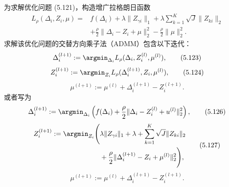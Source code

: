 为求解优化问题 (5.121)，构造增广拉格朗日函数
\begin{equation}
\begin{aligned}
L_\rho(\Delta_i,Z_i,\mu)={}&f(\Delta_i)+\lambda\lVert Z_{\gamma i}\rVert_1
+\lambda\sum_{k=1}^K\sqrt J\lVert Z_{ki}\rVert_2\\
&+\frac\rho2\lVert\Delta_i-Z_i+\mu\rVert_2^2-\frac\rho2\lVert\mu\rVert_2^2.
\end{aligned}
\tag{5.122}
\end{equation}
求解该优化问题的交替方向乘子法（ADMM）包含以下迭代：
\begin{equation}
\Delta_i^{(l+1)}:=\argmin_{\Delta_i}L_\rho(\Delta_i,Z_i^{(l)},\mu^{(l)}),
\tag{5.123}
\end{equation}
\begin{equation}
Z_i^{(l+1)}:=\argmin_{Z_i}L_\rho(\Delta_i^{(l+1)},Z_i,\mu^{(l)}),
\tag{5.124}
\end{equation}
\begin{equation}
\mu^{(l+1)}:=\mu^{(l)}+\Delta_i^{(l+1)}-Z_i^{(l+1)}.
\tag{5.125}
\end{equation}
或者写为
\begin{equation}
\Delta_i^{(l+1)}:=\argmin_{\Delta_i}\left(f(\Delta_i)
+\frac\rho2\lVert\Delta_i-Z_i^{(l)}+u^{(l)}\rVert_2^2\right),
\tag{5.126}
\end{equation}
\begin{equation}
\begin{aligned}
Z_i^{(l+1)}:=\argmin_{Z_i}\Biggl(&\lambda\lVert Z_{\gamma i}\rVert_1+\lambda
+\sum_{k=1}^K\sqrt J\lVert Z_{ki}\rVert_2\\
&+\frac\rho2\lVert\Delta_i^{(l+1)}-Z_i+\mu^{(l)}\rVert_2^2\Biggr),
\end{aligned}
\tag{5.127}
\end{equation}
\begin{equation}
\mu^{(l+1)}:=\mu^{(l)}+\Delta_i^{(l+1)}-Z_i^{(l+1)}.
\tag{5.128}
\end{equation}

